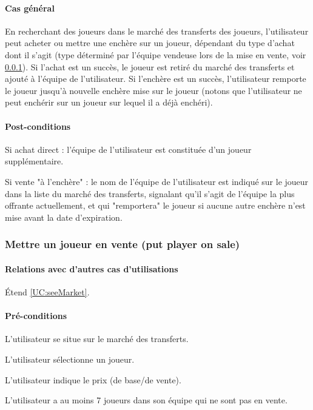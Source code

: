 \paragraph{Cas général}
En recherchant des joueurs dans le marché des transferts des joueurs, l'utilisateur peut acheter ou mettre une enchère sur un joueur, dépendant du type d'achat dont il s'agit (type déterminé par l'équipe vendeuse lors de la mise en vente, voir \ref{UC:putPlayerOnSale}). Si l'achat est un succès, le joueur est retiré du marché des transferts et ajouté à l'équipe de l'utilisateur. Si l'enchère est un succès, l'utilisateur remporte le joueur jusqu'à nouvelle enchère mise sur le joueur (notons que l'utilisateur ne peut enchérir sur un joueur sur lequel il a déjà enchéri). 
\paragraph{Post-conditions}
\begin{list}{}{\leftmargin=1.5em}
\item{Si achat direct : l'équipe de l'utilisateur est constituée d'un joueur supplémentaire.}
\item{Si vente "à l'enchère" : le nom de l'équipe de l'utilisateur est indiqué sur le joueur dans la liste du marché des transferts, signalant qu'il s'agit de l'équipe la plus offrante actuellement, et qui "remportera" le joueur si aucune autre enchère n'est mise avant la date d'expiration.}
\end{list}

\subsubsection{Mettre un joueur en vente (put player on sale)}
\label{UC:putPlayerOnSale}
\paragraph{Relations avec d'autres cas d'utilisations}
Étend \ref{UC:seeMarket}.
\paragraph{Pré-conditions}
\begin{list}{}{\leftmargin=1.5em}
\item{L'utilisateur se situe sur le marché des transferts.}
\item{L'utilisateur sélectionne un joueur.}
\item{L'utilisateur indique le prix (de base/de vente).}
\item{L'utilisateur a au moins 7 joueurs dans son équipe qui ne sont pas en vente.}
\end{list}
